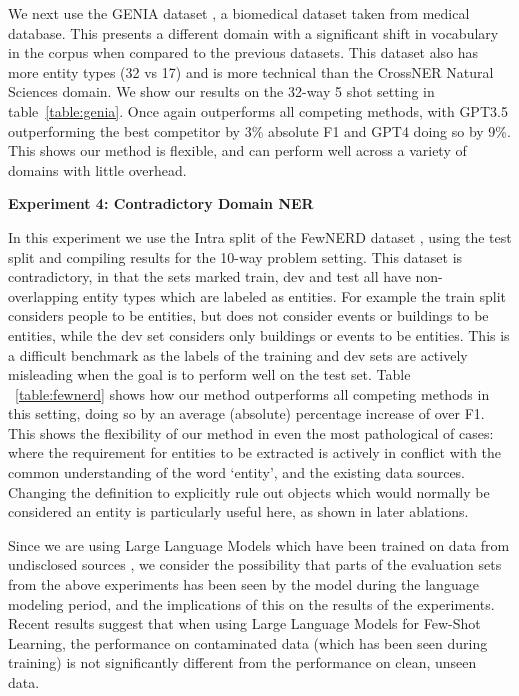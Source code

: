 \documentclass[11pt]{article}
\begin{document}

We next use the GENIA dataset \citep{kim2003genia}, a biomedical dataset taken from medical database. This presents a different domain with a significant shift in vocabulary in the corpus when compared to the previous datasets. This dataset also has more entity types (32 vs 17) and is more technical than the CrossNER Natural Sciences domain. We show our results on the 32-way 5 shot setting in table~\ref{table:genia}. Once again \toolname outperforms all competing methods, with GPT3.5 outperforming the best competitor by 3\% absolute F1 and GPT4 doing so by 9\%. This shows our method is flexible, and can perform well across a variety of domains with little overhead. 


\noindent\textbf{Experiment 4: Contradictory Domain NER} 

In this experiment we use the Intra split of the FewNERD dataset \citep{ding2021few}, using the test split and compiling results for the 10-way problem setting. This dataset is contradictory, in that the sets  marked train, dev and test all have non-overlapping entity types which are labeled as entities. For example the train split considers people to be entities, but does not consider events or buildings to be entities, while the dev set considers only buildings or events to be entities. This is a difficult benchmark as the labels of the training and dev sets are actively misleading when the goal is to perform well on the test set. Table ~\ref{table:fewnerd} shows how our method outperforms all competing methods in this setting, doing so by an average (absolute) percentage increase of over  F1. This shows the flexibility of our method in even the most pathological of cases: where the requirement for entities to be extracted is actively in conflict with the common understanding of the word `entity', and the existing data sources. Changing the definition to explicitly rule out objects which would normally be considered an entity is particularly useful here, as shown in later ablations. 


Since we are using Large Language Models which have been trained on data from undisclosed sources \citep{brown2020language, openai2023gpt4}, we consider the possibility that parts of the evaluation sets from the above experiments has been seen by the model during the language modeling period, and the implications of this on the results of the experiments. Recent results \citep{chowdhery2022palm} suggest that when using Large Language Models for Few-Shot Learning, the performance on contaminated data (which has been seen during training) is not significantly different from the performance on clean, unseen data. 
\end{document}
